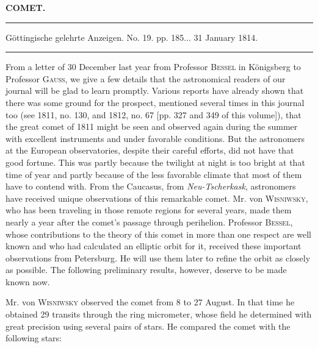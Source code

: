 \clearpage{}\hypertarget{native-378-lower}{}\label{native-378-lower}
\begin{center}\textbf{COMET.}\par\vspace{4pt}\hrule\vspace{4pt}\fontsize{10}{12}\selectfont Göttingische gelehrte Anzeigen. No. 19. pp. 185\;... 31 January 1814.\par\vspace{4pt}\hrule\vspace{4pt}\end{center}

\par\indent From a letter of 30 December last year from Professor \textsc{Bessel} in Königsberg to Professor \textsc{Gauss}, we give a few details that the astronomical readers of our journal will be glad to learn promptly. Various reports have already shown that there was some ground for the prospect, mentioned several times in this journal too (see 1811, no. 130, and 1812, no. 67 [pp. 327 and 349 of this volume]), that the great comet of 1811 might be seen and observed again during the summer with excellent instruments and under favorable conditions. But the astronomers at the European observatories, despite their careful efforts, did not have that good fortune. This was partly because the twilight at night is too bright at that time of year and partly because of the less favorable climate that most of them have to contend with. From the Caucasus, from \emph{Neu-Tscherkask}, astronomers have received unique observations of this remarkable comet. Mr. von \textsc{Wisniwsky}, who has been traveling in those remote regions for several years, made them nearly a year after the comet’s passage through perihelion. Professor \textsc{Bessel}, whose contributions to the theory of this comet in more than one respect are well known and who had calculated an elliptic orbit for it, received these important observations from Petersburg. He will use them later to refine the orbit as closely as possible. The following preliminary results, however, deserve to be made known now.

\par\indent Mr. von \textsc{Wisniwsky} observed the comet from 8 to 27 August. In that time he obtained 29 transits through the ring micrometer, whose field he determined with great precision using several pairs of stars. He compared the comet with the following stars:

